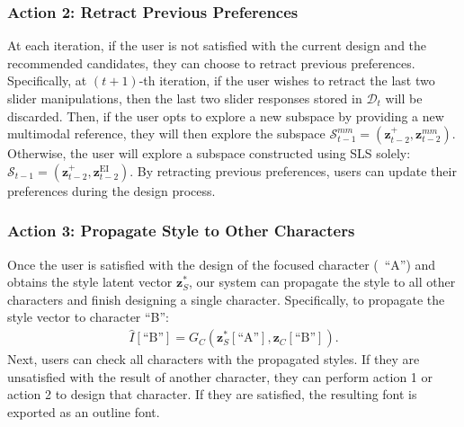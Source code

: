 \subsubsection{Action 2: Retract Previous Preferences}
At each iteration, if the user is not satisfied with the current design and the recommended candidates, they can choose to retract previous preferences.
Specifically, at $(t+1)$-th iteration, if the user wishes to retract the last two slider manipulations, then the last two slider responses stored in $\mathcal{D}_t$ will be discarded.
Then, if the user opts to explore a new subspace by providing a new multimodal reference, they will then explore the subspace $\mathcal{S}^{mm}_{t-1} = (\bm{z}^+_{t-2}, \bm{z}^{mm}_{t-2})$.
Otherwise, the user will explore a subspace constructed using SLS solely: $\mathcal{S}_{t-1} = (\bm{z}^+_{t-2}, \bm{z}^{\text{EI}}_{t-2})$.
By retracting previous preferences, users can update their preferences during the design process.

\subsubsection{Action 3: Propagate Style to Other Characters}
Once the user is satisfied with the design of the focused character (\eg~``A'') and obtains the style latent vector $\bm{z}_S^{*}$, our system can propagate the style to all other characters and finish designing a single character.
Specifically, to propagate the style vector to character ``B'':
\begin{align}
\hat{I}[\text{``B''}] = G_C(\bm{z}_S^{*}[\text{``A''}], \bm{z}_C[\text{``B''}]).
\end{align}
Next, users can check all characters with the propagated styles.
If they are unsatisfied with the result of another character, they can perform action 1 or action 2 to design that character.
If they are satisfied, the resulting font is exported as an outline font.
